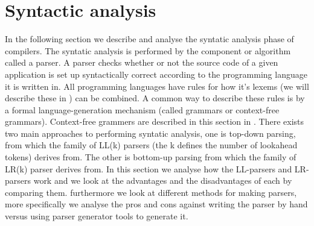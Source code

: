 \section{Syntactic analysis}

In the following section we describe and analyse the syntatic analysis phase of compilers. The syntatic analysis is performed by the component or algorithm called a parser. A parser checks whether or not the source code of a given application is set up syntactically correct according to the programming language it is written in. All programming languages have rules for how it's lexems (we will describe these in ) can be combined. A common way to describe these rules is by a formal language-generation mechanism (called grammars or context-free grammars). Context-free grammers are described in this section in . There exists two main approaches to performing syntatic analysis, one is top-down parsing, from which the family of LL(k) parsers (the k defines the number of lookahead tokens) derives from. The other is bottom-up parsing from which the family of LR(k) parser derives from. In this section we analyse how the LL-parsers and LR-parsers work and we look at the advantages
and the disadvantages of each by comparing them. furthermore we look at different methods for making parsers, more specifically we analyse the pros and cons against writing the parser by hand versus using parser generator tools to generate it.





